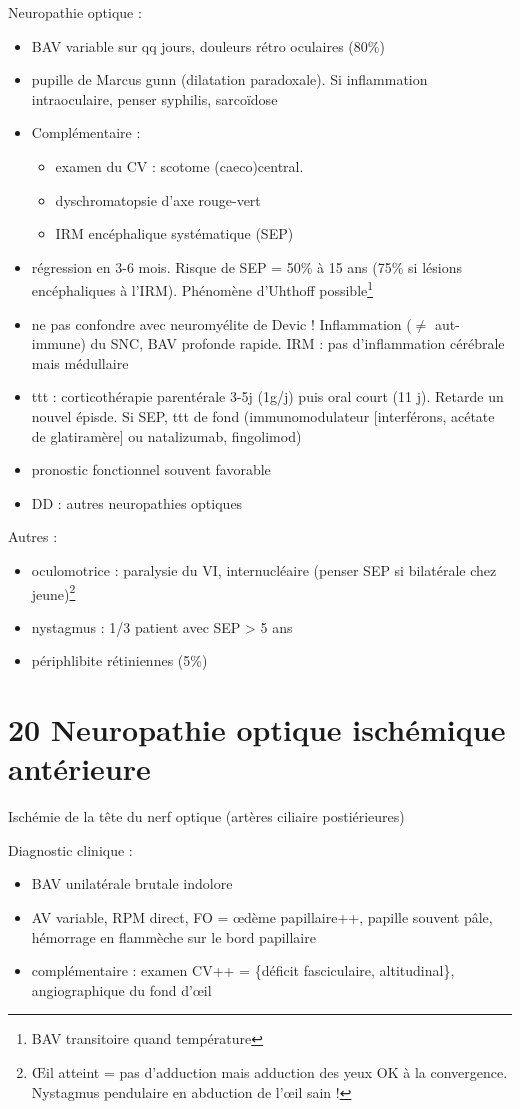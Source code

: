 \documentclass[11pt]{article}
\begin{document}
Neuropathie optique :
\begin{itemize}
\item BAV variable sur qq jours, douleurs rétro oculaires (80\%)
\item pupille de Marcus gunn (dilatation paradoxale). Si inflammation intraoculaire,
penser syphilis, sarcoïdose
\item Complémentaire :
\begin{itemize}
\item examen du CV : scotome (caeco)central.
\item dyschromatopsie d'axe rouge-vert
\item IRM encéphalique systématique (SEP)
\end{itemize}
\item régression en 3-6 mois. Risque de SEP = 50\% à 15 ans (75\% si lésions
encéphaliques à l'IRM). Phénomène d'Uhthoff possible\footnote{BAV transitoire quand température \inc}
\item ne pas confondre avec neuromyélite de Devic ! Inflammation (\(\ne\) aut-immune) du
SNC, BAV profonde rapide. IRM : pas d'inflammation cérébrale mais médullaire
\item ttt : corticothérapie  parentérale 3-5j (1g/j) puis oral court (11 j). Retarde
un nouvel épisde. Si SEP, ttt de fond (immunomodulateur [interférons, acétate
de glatiramère] ou natalizumab, fingolimod)
\item pronostic fonctionnel souvent favorable
\item DD : autres neuropathies optiques
\end{itemize}

Autres :
\begin{itemize}
\item oculomotrice : paralysie du VI, internucléaire (penser SEP si bilatérale chez jeune)\footnote{\OE{}il atteint = pas d'adduction mais adduction des yeux OK à la
convergence. Nystagmus pendulaire en abduction de l'\oe{}il sain !}
\item nystagmus : 1/3 patient avec SEP > 5 ans
\item périphlibite rétiniennes (5\%)
\end{itemize}
\section{20 Neuropathie optique ischémique antérieure}
\label{sec:org3968795}
Ischémie de la tête du nerf optique (artères ciliaire postiérieures)

Diagnostic clinique :
\begin{itemize}
\item BAV unilatérale brutale indolore
\item AV variable, \dec RPM direct, FO = \oe{}dème papillaire++, papille souvent
pâle, hémorrage en flammèche sur le bord papillaire
\item complémentaire : examen CV++ = \{déficit fasciculaire, altitudinal\},
angiographique du fond d'\oe{}il
\end{itemize}
\end{document}
